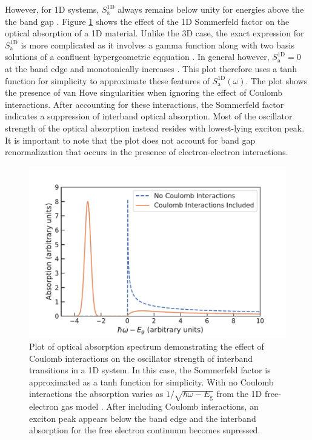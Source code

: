 However, for 1D systems, $S_\text{a}^\text{1D}$ always remains below unity for energies above the the band gap \cite{ogawa1991interband}. Figure \ref{fig:coulomb_enhancement_1d} shows the effect of the 1D Sommerfeld factor on the optical absorption of a 1D material. Unlike the 3D case, the exact expression for $S_\text{a}^\text{1D}$ is more complicated as it involves a gamma function along with two basis solutions of a confluent hypergeometric eqquation \cite{ogawa1991optical}. In general however, $S_\text{a}^\text{1D} = 0$ at the band edge \cite{ogawa1991optical} and monotonically increases \cite{ogawa1991optical}. This plot therefore uses a tanh function for simplicity to approximate these features of $S_\text{a}^\text{1D}(\omega)$. The plot shows the presence of van Hove singularities when ignoring the effect of Coulomb interactions. After accounting for these interactions, the Sommerfeld factor indicates a suppression of interband optical absorption. Most of the oscillator strength of the optical absorption instead resides with lowest-lying exciton peak. It is important to note that the plot does not account for band gap renormalization that occurs in the presence of electron-electron interactions.

\begin{figure}[ht]
	\centering
	\includegraphics[scale=0.8]{images/chapter_optical_props/Sommerfeld_Plot/coulomb_enhancement_1d}
	\caption{Plot of optical absorption spectrum demonstrating the effect of Coulomb interactions on the oscillator strength of interband transitions in a 1D system. In this case, the Sommerfeld factor is approximated as a tanh function for simplicity. With no Coulomb interactions the absorption varies as $1/\sqrt{\hbar\omega - E_\text{g}}$ from the 1D free-electron gas model \cite{Ashcroft}. After including Coulomb interactions, an exciton peak appears below the band edge and the interband absorption for the free electron continuum becomes supressed. }
	\label{fig:coulomb_enhancement_1d}
\end{figure}


